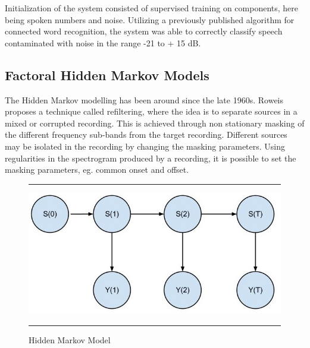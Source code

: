 \documentclass[11pt, oneside, a4paper]{report}
\begin{document}
Initialization of the system consisted of supervised training on components, here being 
spoken numbers and noise. Utilizing a previously published algorithm for connected word recognition, 
the system was able to correctly classify speech contaminated with noise in the range -21 to + 15 dB. 


\subsection{Factoral Hidden Markov Models} %
The Hidden Markov modelling has been around since the late 1960s. Roweis\cite{roweisOneMic} proposes a technique called refiltering, where the idea is to separate sources in a mixed or corrupted recording. This is achieved through non stationary masking of the different frequency sub-bands from the target recording. Different sources may be isolated in the recording by changing the masking parameters. Using regularities in the spectrogram produced by a recording, it is possible to set the masking parameters, eg. common onset and offset. 

\begin{figure}[h]
  \centering
  \hrule
  \includegraphics[width = .9\textwidth]{hmm}
  \hrule
  \caption{Hidden Markov Model}
  \label{hmm_figure}
\end{figure}
\end{document}
